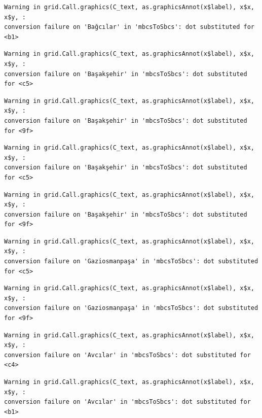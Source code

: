 \documentclass[
  11pt,
  a4paper,
  DIV=11,
  numbers=noendperiod]{scrartcl}
\begin{document}
\begin{verbatim}
Warning in grid.Call.graphics(C_text, as.graphicsAnnot(x$label), x$x, x$y, :
conversion failure on 'Bağcılar' in 'mbcsToSbcs': dot substituted for <b1>
\end{verbatim}

\begin{verbatim}
Warning in grid.Call.graphics(C_text, as.graphicsAnnot(x$label), x$x, x$y, :
conversion failure on 'Başakşehir' in 'mbcsToSbcs': dot substituted for <c5>
\end{verbatim}

\begin{verbatim}
Warning in grid.Call.graphics(C_text, as.graphicsAnnot(x$label), x$x, x$y, :
conversion failure on 'Başakşehir' in 'mbcsToSbcs': dot substituted for <9f>
\end{verbatim}

\begin{verbatim}
Warning in grid.Call.graphics(C_text, as.graphicsAnnot(x$label), x$x, x$y, :
conversion failure on 'Başakşehir' in 'mbcsToSbcs': dot substituted for <c5>
\end{verbatim}

\begin{verbatim}
Warning in grid.Call.graphics(C_text, as.graphicsAnnot(x$label), x$x, x$y, :
conversion failure on 'Başakşehir' in 'mbcsToSbcs': dot substituted for <9f>
\end{verbatim}

\begin{verbatim}
Warning in grid.Call.graphics(C_text, as.graphicsAnnot(x$label), x$x, x$y, :
conversion failure on 'Gaziosmanpaşa' in 'mbcsToSbcs': dot substituted for <c5>
\end{verbatim}

\begin{verbatim}
Warning in grid.Call.graphics(C_text, as.graphicsAnnot(x$label), x$x, x$y, :
conversion failure on 'Gaziosmanpaşa' in 'mbcsToSbcs': dot substituted for <9f>
\end{verbatim}

\begin{verbatim}
Warning in grid.Call.graphics(C_text, as.graphicsAnnot(x$label), x$x, x$y, :
conversion failure on 'Avcılar' in 'mbcsToSbcs': dot substituted for <c4>
\end{verbatim}

\begin{verbatim}
Warning in grid.Call.graphics(C_text, as.graphicsAnnot(x$label), x$x, x$y, :
conversion failure on 'Avcılar' in 'mbcsToSbcs': dot substituted for <b1>
\end{verbatim}
\end{document}
